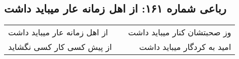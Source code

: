 \begin{center}
\section*{رباعی شماره ۱۶۱: از اهل زمانه عار میباید داشت}
\label{sec:sh161}
\begin{longtable}{l p{0.5cm} r}
از اهل زمانه عار میباید داشت
&&
وز صحبتشان کنار میباید داشت
\\
از پیش کسی کار کسی نگشاید
&&
امید به کردگار میباید داشت
\\
\end{longtable}
\end{center}
